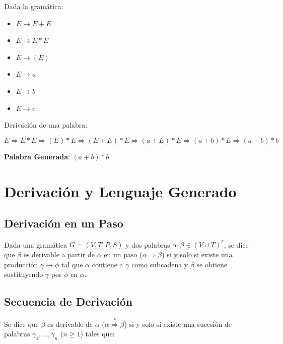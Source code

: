 \documentclass[12pt]{book} %
\begin{document}
\begin{ejemplo}
    Dada la gramática:

    \begin{itemize}
        \item $E \to E + E$
        \item $E \to E * E$
        \item $E \to (E)$
        \item $E \to a$
        \item $E \to b$
        \item $E \to c$
    \end{itemize}

    Derivación de una palabra:

    $$
    E \Rightarrow E * E \Rightarrow (E) * E \Rightarrow (E + E) * E \Rightarrow (a + E) * E \Rightarrow (a + b) * E \Rightarrow (a + b) * b
    $$

    \textbf{Palabra Generada}: $(a + b) * b$
\end{ejemplo}

\hypertarget{derivaciuxf3n-y-lenguaje-generado}{%
\section{Derivación y Lenguaje
Generado}\label{derivaciuxf3n-y-lenguaje-generado}}

\hypertarget{derivaciuxf3n-en-un-paso}{%
\subsection{Derivación en un Paso}\label{derivaciuxf3n-en-un-paso}}

Dada una gramática \(G = (V, T, P, S)\) y dos palabras
\(\alpha, \beta \in (V \cup T)^*\), se dice que \(\beta\) es derivable a
partir de \(\alpha\) en un paso (\(\alpha \Rightarrow \beta\)) si y solo
si existe una producción \(\gamma \to \phi\) tal que \(\alpha\) contiene
a \(\gamma\) como subcadena y \(\beta\) se obtiene sustituyendo
\(\gamma\) por \(\phi\) en \(\alpha\).

\hypertarget{secuencia-de-derivaciuxf3n}{%
\subsection{Secuencia de Derivación}\label{secuencia-de-derivaciuxf3n}}

Se dice que \(\beta\) es derivable de \(\alpha\)
(\(\alpha \overset{*}{\Rightarrow} \beta\)) si y solo si existe una
sucesión de palabras \(\gamma_1, \ldots, \gamma_n\) (\(n \geq 1\)) tales
que:
\end{document}
